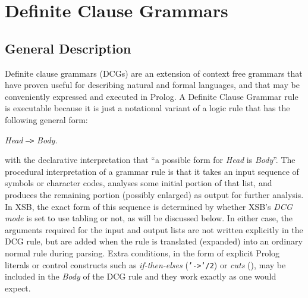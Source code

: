 \chapter{Definite Clause Grammars} \label{DCGs}

\section{General Description}

Definite clause grammars (DCGs) are an extension of context free
grammars that have proven useful for describing natural and formal
languages, and that may be conveniently expressed and executed in
Prolog.  A Definite Clause Grammar rule is executable because it is
just a notational variant of a logic rule that has the following
general form:
\begin{center}
                {\em Head} {\tt -->} {\em Body.}
\end{center}
with the declarative interpretation that ``a possible form for {\em
Head} is {\em Body}''. The procedural interpretation of a grammar rule
is that it takes an input sequence of symbols or character codes,
analyses some initial portion of that list, and produces the remaining
portion (possibly enlarged) as output for further analysis.  In XSB,
the exact form of this sequence is determined by whether XSB's {\em
DCG mode} is set to use tabling or not, as will be discussed below.
In either case, the arguments required for the input and output lists
are not written explicitly in the DCG rule, but are added when the
rule is translated (expanded) into an ordinary normal rule during
parsing.  Extra conditions, in the form of explicit Prolog literals or
control constructs such as {\em if-then-elses} ({\tt '->'/2}) or {\em
cuts} (\cut), may be included in the {\em
Body} of the DCG rule and they work exactly as one would expect.

